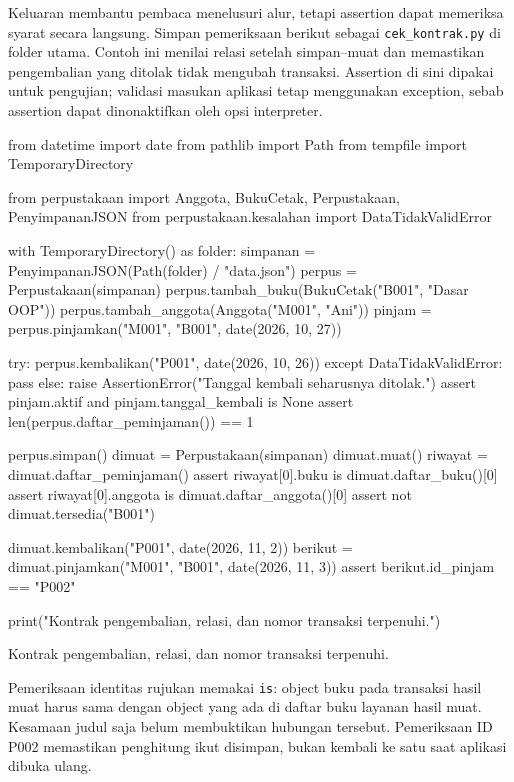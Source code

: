 Keluaran membantu pembaca menelusuri alur, tetapi assertion dapat memeriksa syarat secara langsung. Simpan pemeriksaan berikut sebagai \texttt{cek\_kontrak.py} di folder utama. Contoh ini menilai relasi setelah simpan--muat dan memastikan pengembalian yang ditolak tidak mengubah transaksi. Assertion di sini dipakai untuk pengujian; validasi masukan aplikasi tetap menggunakan exception, sebab assertion dapat dinonaktifkan oleh opsi interpreter.

\begin{kode}
from datetime import date
from pathlib import Path
from tempfile import TemporaryDirectory

from perpustakaan import Anggota, BukuCetak, Perpustakaan, PenyimpananJSON
from perpustakaan.kesalahan import DataTidakValidError


with TemporaryDirectory() as folder:
    simpanan = PenyimpananJSON(Path(folder) / "data.json")
    perpus = Perpustakaan(simpanan)
    perpus.tambah_buku(BukuCetak("B001", "Dasar OOP"))
    perpus.tambah_anggota(Anggota("M001", "Ani"))
    pinjam = perpus.pinjamkan("M001", "B001", date(2026, 10, 27))

    try:
        perpus.kembalikan("P001", date(2026, 10, 26))
    except DataTidakValidError:
        pass
    else:
        raise AssertionError("Tanggal kembali seharusnya ditolak.")
    assert pinjam.aktif and pinjam.tanggal_kembali is None
    assert len(perpus.daftar_peminjaman()) == 1

    perpus.simpan()
    dimuat = Perpustakaan(simpanan)
    dimuat.muat()
    riwayat = dimuat.daftar_peminjaman()
    assert riwayat[0].buku is dimuat.daftar_buku()[0]
    assert riwayat[0].anggota is dimuat.daftar_anggota()[0]
    assert not dimuat.tersedia("B001")

    dimuat.kembalikan("P001", date(2026, 11, 2))
    berikut = dimuat.pinjamkan("M001", "B001", date(2026, 11, 3))
    assert berikut.id_pinjam == "P002"

print("Kontrak pengembalian, relasi, dan nomor transaksi terpenuhi.")
\end{kode}

\begin{keluaran}
Kontrak pengembalian, relasi, dan nomor transaksi terpenuhi.
\end{keluaran}

Pemeriksaan identitas rujukan memakai \texttt{is}: object buku pada transaksi hasil muat harus sama dengan object yang ada di daftar buku layanan hasil muat. Kesamaan judul saja belum membuktikan hubungan tersebut. Pemeriksaan ID P002 memastikan penghitung ikut disimpan, bukan kembali ke satu saat aplikasi dibuka ulang.

